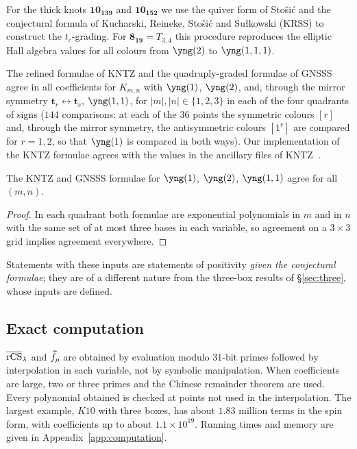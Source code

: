 For the thick knots $\mathbf{10_{139}}$ and $\mathbf{10_{152}}$
we use the quiver form of Sto\v{s}i\'c \cite{Stosic24} and the conjectural formula of Kucharski, Reineke, Sto\v{s}i\'c and Su\l{}kowski (KRSS) \cite{Kucharski17b} to construct the $t_c$-grading.
For $\mathbf{8_{19}}=T_{3,4}$ this procedure reproduces the elliptic Hall algebra values for all colours from $\yng(2)$ to $\yng(1,1,1)$.
\begin{compresult}\label{cr:kntz}
The refined formulae of KNTZ and the quadruply-graded formulae of GNSSS agree in all coefficients for $K_{m,n}$ with $\yng(1)$, $\yng(2)$, and, through the mirror symmetry $\mathbf{t}_r\leftrightarrow\mathbf{t}_c$, $\yng(1,1)$,
for $|m|,|n|\in\{1,2,3\}$ in each of the four quadrants of signs
($144$ comparisons: at each of the $36$ points the symmetric colours $[r]$ and, through the mirror symmetry, the antisymmetric colours $[1^r]$ are compared for $r=1,2$, so that $\yng(1)$ is compared in both ways).
Our implementation of the KNTZ formulae agrees with the values in the ancillary files of KNTZ~\cite{Kameyama19}.
\end{compresult}
\begin{corollary}
The KNTZ and GNSSS formulae for $\yng(1)$, $\yng(2)$, $\yng(1,1)$ agree for all $(m,n)$.
\end{corollary}
\begin{proof}
In each quadrant both formulae are exponential polynomials in $m$ and in $n$ with the same set of at most three bases in each variable, so agreement on a $3\times3$ grid implies agreement everywhere.
\end{proof}
Statements with these inputs are statements of positivity \emph{given the conjectural formulae}; they are of a different nature from the three-box results of \S\ref{sec:three}, whose inputs are defined.

\subsection{Exact computation}\label{sec:exact}
$\overline{\mathrm{rCS}}_\lambda$ and $\widehat{f}_\rho$ are obtained by evaluation modulo $31$-bit primes followed by interpolation in each variable, not by symbolic manipulation.
When coefficients are large, two or three primes and the Chinese remainder theorem are used.
Every polynomial obtained is checked at points not used in the interpolation.
The largest example, $K10$ with three boxes, has about $1.83$ million terms in the spin form, with coefficients up to about $1.1\times10^{19}$.
Running times and memory are given in Appendix~\ref{app:computation}.
